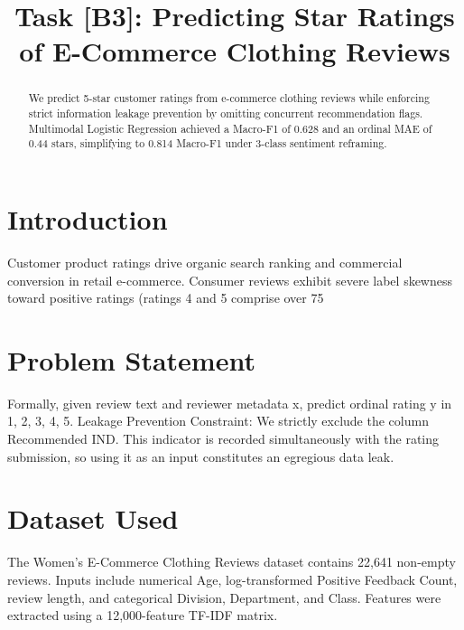 \documentclass[conference]{IEEEtran}
\begin{document}
\title{Task [B3]: Predicting Star Ratings of E-Commerce Clothing Reviews}

\author{
}

\maketitle

\begin{abstract}
We predict 5-star customer ratings from e-commerce clothing reviews while enforcing strict information leakage prevention by omitting concurrent recommendation flags. Multimodal Logistic Regression achieved a Macro-F1 of 0.628 and an ordinal MAE of 0.44 stars, simplifying to 0.814 Macro-F1 under 3-class sentiment reframing.
\end{abstract}

\section{Introduction}
Customer product ratings drive organic search ranking and commercial conversion in retail e-commerce. Consumer reviews exhibit severe label skewness toward positive ratings (ratings 4 and 5 comprise over 75%

\section{Problem Statement}
Formally, given review text and reviewer metadata x, predict ordinal rating y in {1, 2, 3, 4, 5}. Leakage Prevention Constraint: We strictly exclude the column Recommended IND. This indicator is recorded simultaneously with the rating submission, so using it as an input constitutes an egregious data leak.

\section{Dataset Used}
The Women’s E-Commerce Clothing Reviews dataset contains 22,641 non-empty reviews. Inputs include numerical Age, log-transformed Positive Feedback Count, review length, and categorical Division, Department, and Class. Features were extracted using a 12,000-feature TF-IDF matrix.
\end{document}

